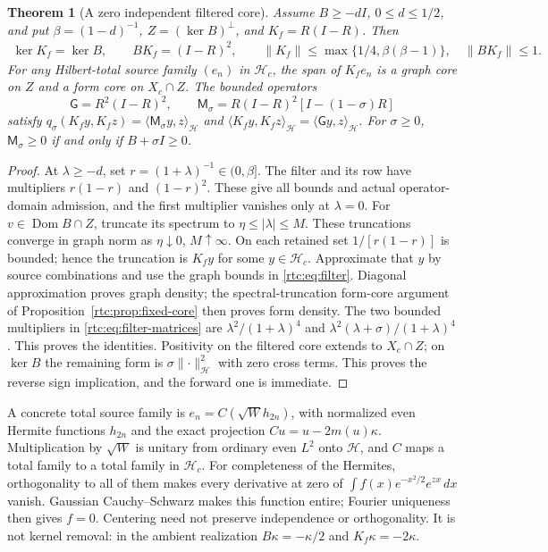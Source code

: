 \documentclass[11pt,a4paper]{article}
\numberwithin{equation}{section}
\newtheorem{theorem}{Theorem}[section]
\theoremstyle{definition}\newtheorem{definition}[theorem]{Definition}
\theoremstyle{remark}\newtheorem{remark}[theorem]{Remark}
\newcommand{\Hh}{\mathcal H}\newcommand{\Hw}{\mathcal H}
\newcommand{\ip}[2]{\langle#1,#2\rangle}\newcommand{\norm}[1]{\lVert#1\rVert}\newcommand{\abs}[1]{\lvert#1\rvert}
\begin{document}
\begin{theorem}[A zero independent filtered core]\label{rtc:thm:filter}
Assume $B\ge-dI$, $0\le d\le1/2$, and put $\beta=(1-d)^{-1}$,
$Z=(\ker B)^\perp$, and $K_f=R(I-R)$.
Then
\begin{gather}\label{rtc:eq:filter}
 \ker K_f=\ker B,\qquad BK_f=(I-R)^2,\qquad
 \norm{K_f}\le\max\{1/4,\beta(\beta-1)\},\quad\norm{BK_f}\le1.
\end{gather}
For any Hilbert-total source family $(e_n)$ in $\Hh_c$, the span of
$K_fe_n$ is a graph core on $Z$ and a form core on $X_c\cap Z$.
The bounded operators
\begin{equation}\label{rtc:eq:filter-matrices}
 \mathsf G=R^2(I-R)^2,\qquad
 \mathsf M_\sigma=R(I-R)^2[I-(1-\sigma)R]
\end{equation}
satisfy $q_\sigma(K_fy,K_fz)=\ip{\mathsf M_\sigma y}{z}_{\Hh}$ and
$\ip{K_fy}{K_fz}_{\Hh}=\ip{\mathsf Gy}{z}_{\Hh}$.
For $\sigma\ge0$, $\mathsf M_\sigma\ge0$ if and only if $B+\sigma I\ge0$.
\end{theorem}
\begin{proof}
At $\lambda\ge-d$, set $r=(1+\lambda)^{-1}\in(0,\beta]$.
The filter and its row have multipliers $r(1-r)$ and $(1-r)^2$.
These give all bounds and actual operator-domain admission, and the first
multiplier vanishes only at $\lambda=0$. For
$v\in\operatorname{Dom}B\cap Z$, truncate its spectrum to
$\eta\le|\lambda|\le M$. These truncations converge in graph norm as
$\eta\downarrow0$, $M\uparrow\infty$. On each retained set $1/[r(1-r)]$
is bounded; hence the truncation is $K_fy$ for some $y\in\Hh_c$.
Approximate that $y$ by source combinations and use the graph bounds in
\eqref{rtc:eq:filter}. Diagonal approximation proves graph density; the
spectral-truncation form-core argument of Proposition~\ref{rtc:prop:fixed-core}
then proves form density.
The two bounded multipliers in \eqref{rtc:eq:filter-matrices} are
$\lambda^2/(1+\lambda)^4$ and
$\lambda^2(\lambda+\sigma)/(1+\lambda)^4$.
This proves the identities. Positivity on the filtered core extends to
$X_c\cap Z$; on $\ker B$ the remaining form is
$\sigma\norm{\cdot}_{\Hh}^2$ with zero cross terms. This proves the
reverse sign implication, and the forward one is immediate.
\end{proof}
A concrete total source family is
$e_n=C(\sqrt W h_{2n})$, with normalized even Hermite functions $h_{2n}$
and the exact projection $Cu=u-2m(u)\kappa$.
Multiplication by $\sqrt W$ is unitary from ordinary even $L^2$ onto
$\Hh$, and $C$ maps a total family to a total family in $\Hh_c$.
For completeness of the Hermites, orthogonality to all of them makes every
derivative at zero of
$\int f(x)e^{-x^2/2}e^{zx}\,dx$ vanish. Gaussian Cauchy--Schwarz makes
this function entire; Fourier uniqueness then gives $f=0$.
Centering need not preserve independence or orthogonality. It is not kernel
removal: in the ambient realization $B\kappa=-\kappa/2$ and
$K_f\kappa=-2\kappa$.
\end{document}
